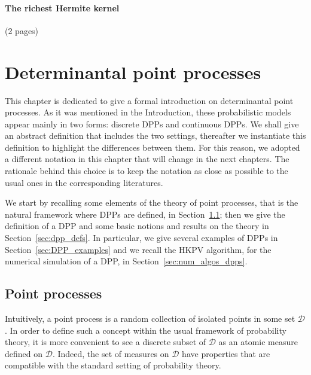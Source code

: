 \documentclass[twoside,11pt]{book}
\numberwithin{theorem}{chapter}
\numberwithin{definition}{chapter}
\numberwithin{proposition}{chapter}
\numberwithin{corollary}{chapter}
\numberwithin{example}{chapter}
\numberwithin{lemma}{chapter}
\numberwithin{assumption}{chapter}
\begin{document}
\subsubsection{The richest Hermite kernel}
(2 pages)

\clearpage
\chapter{Determinantal point processes}\label{chapter:dpp}

This chapter is dedicated to give a formal introduction on determinantal point processes. As it was mentioned in the Introduction, these probabilistic models appear mainly in two forms: discrete DPPs and continuous DPPs. We shall give an abstract definition that includes the two settings, thereafter we instantiate this definition to highlight the differences between them. For this reason, we adopted a different notation in this chapter that will change in the next chapters. The rationale behind this choice is to keep the notation as close as possible to the usual ones in the corresponding literatures.

We start by recalling some elements of the theory of point processes, that is the natural framework where DPPs are defined, in Section~\ref{sec:pointprocesses}; then we give the definition of a DPP and some basic notions and results on the theory in Section~\ref{sec:dpp_defs}. In particular, we give several examples of DPPs in Section~\ref{sec:DPP_examples} and we recall the HKPV algorithm, for the numerical simulation of a DPP, in Section~\ref{sec:num_algos_dpps}.





\section{Point processes}\label{sec:pointprocesses}

Intuitively, a point process is a random collection of isolated points in some set $\mathcal{D}$. In order to define such a concept within the usual framework of probability theory, it is more convenient to see a discrete subset of $\mathcal{D}$ as an atomic measure defined on $\mathcal{D}$. Indeed, the set of measures on $\mathcal{D}$ have properties that are compatible with the standard setting of probability theory. 
\end{document}
